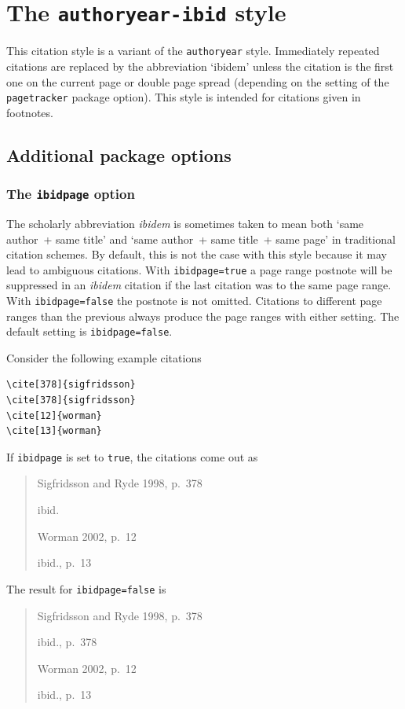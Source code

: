 \documentclass[a4paper]{article}
\begin{document}
\section*{The \texttt{authoryear-ibid} style}

This citation style is a variant of the \texttt{authoryear} style.
Immediately repeated citations are replaced by the abbreviation
`ibidem' unless the citation is the first one on the current page or
double page spread (depending on the setting of the
\texttt{pagetracker} package option). This style is intended for
citations given in footnotes.

\subsection*{Additional package options}

\subsubsection*{The \texttt{ibidpage} option}

The scholarly abbreviation \emph{ibidem} is sometimes taken to mean
both `same author~+ same title' and `same author~+ same title~+ same
page' in traditional citation schemes. By default, this is not the
case with this style because it may lead to ambiguous citations.
With \texttt{ibidpage=true} a page range postnote will be suppressed
in an \emph{ibidem} citation if the last citation was to the same
page range. With \texttt{ibidpage=false} the postnote is not omitted.
Citations to different page ranges than the previous always produce
the page ranges with either setting.
The default setting is \texttt{ibidpage=false}.

Consider the following example citations
\begin{verbatim}
\cite[378]{sigfridsson}
\cite[378]{sigfridsson}
\cite[12]{worman}
\cite[13]{worman}
\end{verbatim}
%
If \texttt{ibidpage} is set to \texttt{true}, the citations
come out as
\begin{quote}
Sigfridsson and Ryde 1998, p.~378

ibid.

Worman 2002, p.~12

ibid., p.~13
\end{quote}
%
The result for \texttt{ibidpage=false} is
\begin{quote}
Sigfridsson and Ryde 1998, p.~378

ibid., p.~378

Worman 2002, p.~12

ibid., p.~13
\end{quote}
\end{document}
